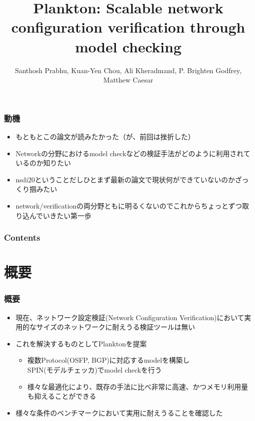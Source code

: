 \documentclass[dvipdfmx,9pt,notheorems]{beamer}
\title{Plankton: Scalable network configuration verification through model checking}
\author{Santhosh Prabhu\footnotemark[1], Kuan-Yen Chou\footnotemark[1], Ali Kheradmand\footnotemark[1], P. Brighten Godfrey\footnotemark[1], Matthew Caesar\footnotemark[1]}
\institute{\footnotemark[1]University of Illinois at Urbana-Champaign}
\theoremstyle{definition}
\begin{document}
\begin{frame}[plain]\frametitle{}
\titlepage %
\end{frame}

\begin{frame}\frametitle{動機}
	\begin{itemize}
		\item もともとこの論文が読みたかった（が、前回は挫折した）
		\item Networkの分野におけるmodel checkなどの検証手法がどのように利用されているのか知りたい
		\item nsdi20ということだしひとまず最新の論文で現状何ができていないのかざっくり掴みたい
		\item network/verificationの両分野ともに明るくないのでこれからちょっとずつ取り込んでいきたい第一歩
	\end{itemize}
\end{frame}

\begin{frame}\frametitle{Contents}
\raggedright
\tableofcontents
\end{frame}


\section{概要}
\begin{frame}\frametitle{概要}
\begin{itemize}
	\item 現在、ネットワーク設定検証(Network Configuration Verification)において実用的なサイズのネットワークに耐えうる検証ツールは無い
	\item これを解決するものとしてPlanktonを提案
	\begin{itemize}
		\item 複数Protocol(OSFP, BGP)に対応するmodelを構築し\\
			SPIN(モデルチェッカ)でmodel checkを行う
		\item 様々な最適化により、既存の手法に比べ非常に高速、かつメモリ利用量も抑えることができる
	\end{itemize}
	\item 様々な条件のベンチマークにおいて実用に耐えうることを確認した
\end{itemize}
\pnote{
}
\end{frame}
\end{document}

